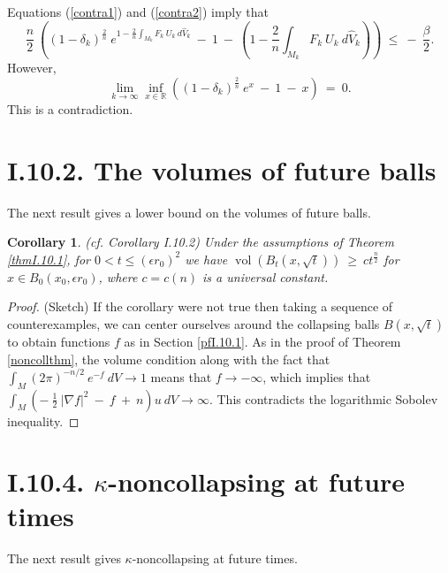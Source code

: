\documentclass[12pt]{amsart}
\newcommand{\R}{{\mathbb R}}
\newcommand{\vol}{\operatorname{vol}}
\numberwithin{equation}{section}
\theoremstyle{plain}
\newtheorem{corollary}[equation]{Corollary}
\theoremstyle{definition}
\theoremstyle{remark}
\begin{document}
Equations (\ref{contra1}) and (\ref{contra2}) imply that
\begin{equation}
\frac{n}{2} \: \left( (1 - \delta_k)^{\frac{2}{n}} \: e^{1 - \frac{2}{n} \int_{M_k}
F_k \: U_k \: d\widehat{V}_k} \: - \: 1 \: - \:
\left( 1 - \frac{2}{n} \int_{M_k}
F_k \: U_k \: d\widehat{V}_k \right) \right) \: \le \: - \: \frac{\beta}{2}.
\end{equation}
However,
\begin{equation}
\lim_{k \rightarrow \infty} \inf_{x \in \R} 
\left(
(1 - \delta_k)^{\frac{2}{n}} \: e^{x} \: - \: 1 \: - \: x \right) \: = \: 0.
\end{equation}
This is a contradiction.


\section{I.10.2. The volumes of future balls}

The next result gives a lower bound on the volumes of future
balls.

\begin{corollary} (cf. Corollary I.10.2) \label{corI.10.2}
Under the assumptions of Theorem \ref{thmI.10.1}, for
$0 < t \le (\epsilon r_0)^2$ we have
$\vol(B_t(x, \sqrt{t})) \: \ge \: c t^{\frac{n}{2}}$ for $x \in B_0(x_0, \epsilon r_0)$,
where $c = c(n)$ is a universal constant. 
\end{corollary}
\begin{proof} (Sketch)
If the corollary were not true then taking a sequence of counterexamples,
we can center ourselves around the
collapsing balls $B(x, \sqrt{t})$ to obtain functions $f$ as in Section \ref{pfI.10.1}.
As in the proof of Theorem \ref{noncollthm}, the volume condition
along with the fact that $\int_M (2 \pi)^{-n/2} \: e^{-f} \: dV \rightarrow 1$
means that $f \rightarrow - \infty$, which implies that
$\int_M \left( - \: \frac12 \: |\nabla f|^2 \: - \: f \: + \: n \right) u \: dV 
\rightarrow \infty$. This contradicts the logarithmic Sobolev inequality.
\end{proof}

\section{I.10.4. $\kappa$-noncollapsing at future times}

The next result gives $\kappa$-noncollapsing at future times.
\end{document}
